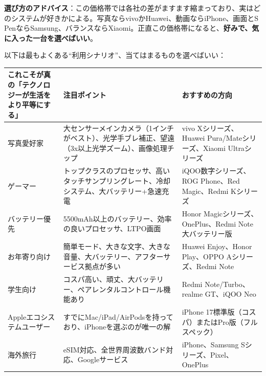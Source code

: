\textbf{選び方のアドバイス}：この価格帯では各社の差がますます縮まっており、実はどのシステムが好きかによる。写真ならvivoかHuawei、動画ならiPhone、画面とS PenならSamsung、バランスならXiaomi。正直この価格帯になると、\textbf{好みで、気に入った一台を選べばいい}。


以下は最もよくある“利用シナリオ”、当てはまるものを選べばいい：

\begin{center}
\begin{tabularx}{\linewidth}{|X|X|X|}
\hline
\textbf{これこそが真の「テクノロジーが生活をより平等にする」} & \textbf{注目ポイント} & \textbf{おすすめの方向} \tabularnewline
\hline
写真愛好家 & 大センサーメインカメラ（1インチがベスト）、光学手ブレ補正、望遠（3x以上光学ズーム）、画像処理チップ & vivo Xシリーズ、Huawei Pura/Mateシリーズ、Xiaomi Ultraシリーズ \tabularnewline
ゲーマー & トップクラスのプロセッサ、高いタッチサンプリングレート、冷却システム、大バッテリー+急速充電 & iQOO数字シリーズ、ROG Phone、Red Magic、Redmi Kシリーズ \tabularnewline
バッテリー優先 & 5500mAh以上のバッテリー、効率の良いプロセッサ、LTPO画面 & Honor Magicシリーズ、OnePlus、Redmi Note大バッテリー版 \tabularnewline
お年寄り向け & 簡単モード、大きな文字、大きな音量、大バッテリー、アフターサービス拠点が多い & Huawei Enjoy、Honor Play、OPPO Aシリーズ、Redmi Note \tabularnewline
学生向け & コスパ高い、頑丈、大バッテリー、ペアレンタルコントロール機能あり & Redmi Note/Turbo、realme GT、iQOO Neo \tabularnewline
Appleエコシステムユーザー & すでにMac/iPad/AirPodsを持っており、iPhoneを選ぶのが唯一の解 & iPhone 17標準版（コスパ）またはPro版（フルスペック） \tabularnewline
海外旅行 & eSIM対応、全世界周波数バンド対応、Googleサービス & iPhone、Samsung Sシリーズ、Pixel、OnePlus \tabularnewline
\hline
\end{tabularx}
\end{center}


